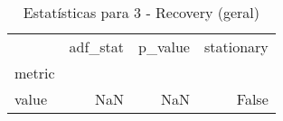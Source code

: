 \begin{table}[htbp]
\caption{Estatísticas para 3 - Recovery (geral)}
\label{tab:3_-_recovery_(geral)_adf_test}
\begin{tabular}{lrrr}
\toprule
 & adf_stat & p_value & stationary \\
metric &  &  &  \\
\midrule
value & NaN & NaN & False \\
\bottomrule
\end{tabular}
\end{table}
